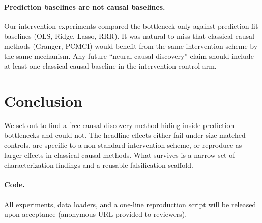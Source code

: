\documentclass{article}
\begin{document}
\paragraph{Prediction baselines are not causal baselines.} Our
intervention experiments compared the bottleneck only against
prediction-fit baselines (OLS, Ridge, Lasso, RRR). It was natural to
miss that classical causal methods (Granger, PCMCI) would benefit from
the same intervention scheme by the same mechanism. Any future
``neural causal discovery'' claim should include at least one classical
causal baseline in the intervention control arm.

\section{Conclusion}

We set out to find a free causal-discovery method hiding inside
prediction bottlenecks and could not. The headline effects either fail
under size-matched controls, are specific to a non-standard intervention
scheme, or reproduce as larger effects in classical causal methods. What
survives is a narrow set of characterization findings and a reusable
falsification scaffold.

\paragraph{Code.} All experiments, data loaders, and a one-line
reproduction script will be released upon acceptance (anonymous URL
provided to reviewers).



\end{document}
